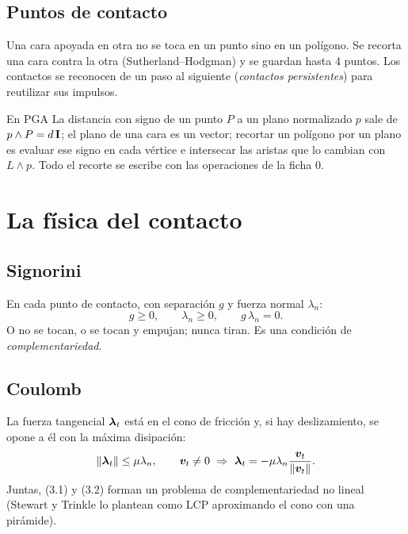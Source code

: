 \documentclass[11pt,a4paper]{article}
\begin{document}
\subsection{Puntos de contacto}
Una cara apoyada en otra no se toca en un punto sino en un polígono. Se recorta una cara contra la otra
(Sutherland--Hodgman) y se guardan hasta 4 puntos. Los contactos se reconocen de un paso al siguiente (\emph{contactos
persistentes}) para reutilizar sus impulsos.

\begin{nota}{En PGA}
La distancia con signo de un punto $P$ a un plano normalizado $p$ sale de $p\wedge P = d\,\mathbf{I}$; el plano de una cara
es un vector; recortar un polígono por un plano es evaluar ese signo en cada vértice e intersecar las aristas que lo
cambian con $L\wedge p$. Todo el recorte se escribe con las operaciones de la ficha 0.
\end{nota}

\section{La física del contacto}

\subsection{Signorini}
En cada punto de contacto, con separación $g$ y fuerza normal $\lambda_n$:
\begin{equation}
  g \ge 0,\qquad \lambda_n \ge 0,\qquad g\,\lambda_n = 0 .
\end{equation}
O no se tocan, o se tocan y empujan; nunca tiran. Es una condición de \emph{complementariedad}.

\subsection{Coulomb}
La fuerza tangencial $\bm{\lambda}_t$ está en el cono de fricción y, si hay deslizamiento, se opone a él con la máxima
disipación:
\begin{equation}
  \lVert\bm{\lambda}_t\rVert\le\mu\lambda_n,\qquad \bm{v}_t \ne 0\ \Rightarrow\ \bm{\lambda}_t = -\mu\lambda_n\frac{\bm{v}_t}{\lVert\bm{v}_t\rVert}.
\end{equation}
Juntas, (3.1) y (3.2) forman un problema de complementariedad no lineal (Stewart y Trinkle lo plantean como LCP
aproximando el cono con una pirámide).
\end{document}
